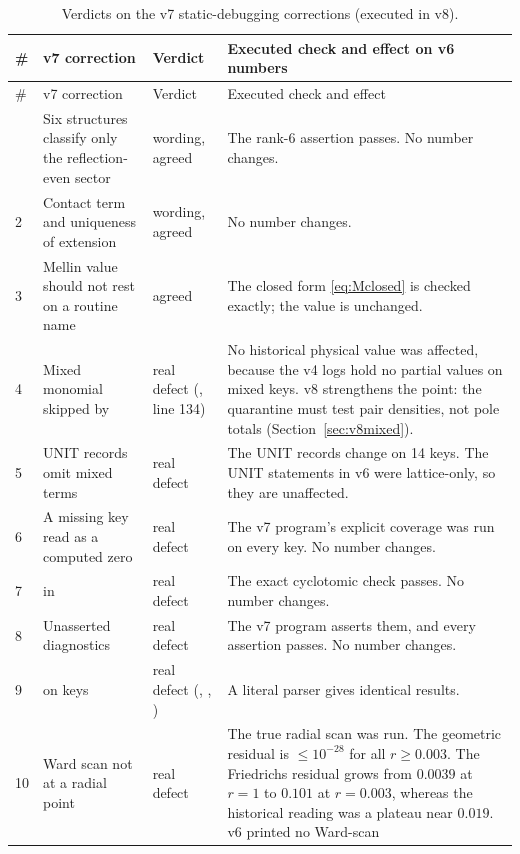 \begingroup\small
\begin{longtable}{@{}p{.04\linewidth}L{.30\linewidth}L{.16\linewidth}L{.42\linewidth}@{}}
\caption{Verdicts on the v7 static-debugging corrections
(executed in v8).}
\label{tab:v8verdict}\\
\toprule
\# & v7 correction & Verdict & Executed check and effect on v6 numbers\\
\midrule
\endfirsthead
\toprule
\# & v7 correction & Verdict & Executed check and effect\\
\midrule
\endhead
\bottomrule
{} & Six structures classify only the reflection-even sector &
wording, agreed & The rank-6 assertion passes. No number changes.\\
2 & Contact term and uniqueness of extension & wording, agreed &
No number changes.\\
3 & Mellin value should not rest on a routine name & agreed &
The closed form \eqref{eq:Mclosed} is checked exactly; the value is
unchanged.\\
4 & Mixed monomial skipped by  & real defect
(, line 134) & No historical physical value
was affected, because the v4 logs hold no partial values on mixed
keys. v8 strengthens the point: the quarantine must test pair
densities, not pole totals (Section~\ref{sec:v8mixed}).\\
5 & UNIT records omit mixed terms & real defect & The UNIT records
change on 14 keys. The UNIT statements in v6 were lattice-only, so
they are unaffected.\\
6 & A missing key read as a computed zero & real defect &
The v7 program's explicit  coverage was run on
every key. No number changes.\\
7 &  in  & real defect &
The exact cyclotomic check passes. No number changes.\\
8 & Unasserted diagnostics & real defect & The v7 program asserts
them, and every assertion passes. No number changes.\\
9 &  on keys & real defect (,
, ) & A literal parser gives
identical results.\\
10 & Ward scan not at a radial point & real defect & The true
radial scan was run. The geometric residual is \(\le10^{-28}\) for
all \(r\ge0.003\). The Friedrichs residual grows from \(0.0039\)
at \(r=1\) to \(0.101\) at \(r=0.003\), whereas the historical
reading was a plateau near \(0.019\). v6 printed no Ward-scan

\end{longtable}
